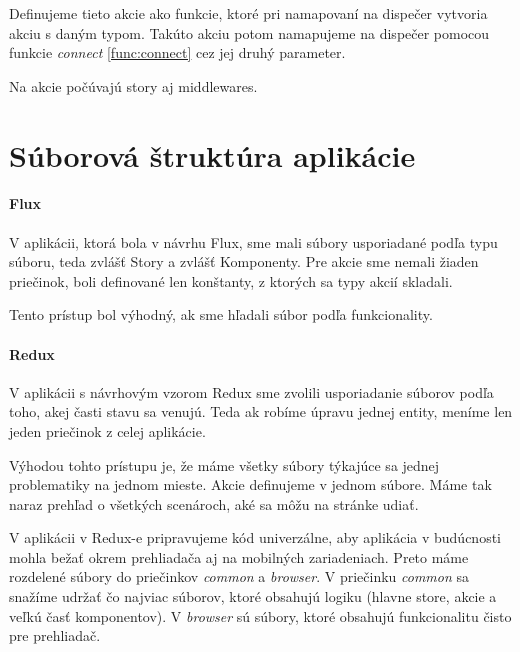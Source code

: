 Definujeme tieto akcie ako funkcie, ktoré pri namapovaní na dispečer vytvoria akciu s daným typom. Takúto akciu potom namapujeme na dispečer pomocou funkcie \emph{connect} \ref{func:connect} cez jej druhý parameter.

Na akcie počúvajú story aj middlewares.



\section{Súborová štruktúra aplikácie}
\paragraph{Flux}
V aplikácii, ktorá bola v návrhu Flux, sme mali súbory usporiadané podľa typu súboru, teda zvlášť Story a zvlášť Komponenty. Pre akcie sme nemali žiaden priečinok, boli definované len konštanty, z ktorých sa typy akcií skladali.

Tento prístup bol výhodný, ak sme hľadali súbor podľa funkcionality.

\paragraph{Redux}
V aplikácii s návrhovým vzorom Redux sme zvolili usporiadanie súborov podľa toho, akej časti stavu sa venujú. Teda ak robíme úpravu jednej entity, meníme len jeden priečinok z celej aplikácie.

Výhodou tohto prístupu je, že máme všetky súbory týkajúce sa jednej problematiky na jednom mieste.
Akcie definujeme v jednom súbore. Máme tak naraz prehľad o všetkých scenároch, aké sa môžu na stránke udiať.

V aplikácii v Redux-e pripravujeme kód univerzálne, aby aplikácia v budúcnosti mohla bežať okrem prehliadača aj na mobilných zariadeniach. Preto máme rozdelené súbory do priečinkov \emph{common} a \emph{browser}. V priečinku \emph{common} sa snažíme udržať čo najviac súborov, ktoré obsahujú logiku (hlavne store, akcie a veľkú časť komponentov). V \emph{browser} sú súbory, ktoré obsahujú funkcionalitu čisto pre prehliadač.
